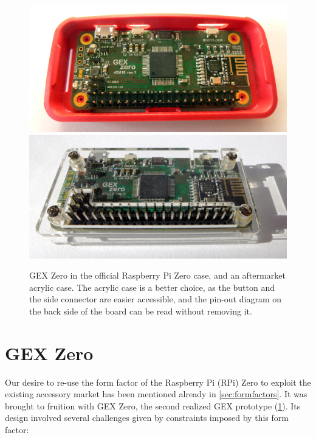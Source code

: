 \begin{figure}[h]
	\centering
	\includegraphics[width=.85\textwidth]{img/photo-zero-picase.jpg} \\
	\vspace{1mm}
	\includegraphics[width=.85\textwidth]{img/photo-zero-transparent.jpg}
	\caption[The GEX Zero module]{\label{fig:gexzcases}GEX Zero in the official Raspberry Pi Zero case, and an aftermarket acrylic case. The acrylic case is a better choice, as the button and the side connector are easier accessible, and the pin-out diagram on the back side of the board can be read without removing it.}
\end{figure}

\section{GEX Zero}\label{sec:gzero}

Our desire to re-use the form factor of the Raspberry Pi (RPi) Zero to exploit the existing accessory market has been mentioned already in \cref{sec:formfactors}. It was brought to fruition with GEX Zero, the second realized GEX prototype (\cref{fig:gexzcases}). Its design involved several challenges given by constraints imposed by this form factor:

